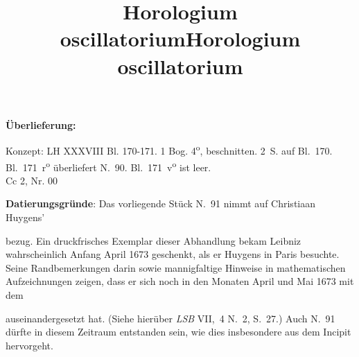 \begin{ledgroupsized}[r]{120mm}
\footnotesize 
                \pstart                
                \noindent\textbf{\"{U}berlieferung:}   
                \pend
                \end{ledgroupsized}
            
              
                           \begin{ledgroupsized}[r]{114mm}
                            \footnotesize 
                            \pstart \parindent -6mm
                            Konzept: LH XXXVIII Bl. 170-171.
1 Bog. 4\textsuperscript{o}, beschnitten.
2~S. auf Bl.~170.
Bl.~171~r\textsuperscript{o} überliefert N.~90. %
Bl.~171~v\textsuperscript{o} ist leer.
\\Cc 2, Nr. 00 \pend
                                                        \end{ledgroupsized}
                                                         
                \vspace*{5mm}
                \begin{ledgroup}
                \footnotesize 
                \pstart
            \noindent\footnotesize{\textbf{Datierungsgr\"{u}nde}: Das vorliegende Stück N.~91 %
nimmt auf Christiaan Huygens' \cite{00123}\title{Horologium oscillatorium} bezug.
Ein druckfrisches Exemplar dieser Abhandlung bekam Leibniz wahrscheinlich Anfang April 1673 geschenkt,
als er Huygens in Paris besuchte.
Seine Randbemerkungen darin sowie mannigfaltige Hinweise in mathematischen Aufzeichnungen zeigen,
dass er sich noch in den Monaten April und Mai 1673 mit dem \cite{00123}\title{Horologium oscillatorium} auseinandergesetzt hat.
(Siehe hierüber \cite{00262}\textit{LSB} VII,~4 N.~2, S.~27.)
Auch N.~91 %
d\"{u}rfte in diesem Zeitraum entstanden sein,
wie dies insbesondere aus dem Incipit hervorgeht.
}
                \pend
                \end{ledgroup}
            

